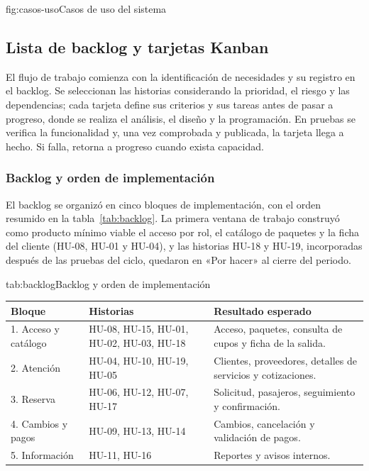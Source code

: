 \begin{landscape}
\thispagestyle{paisaje}
\begin{figuraapa}{fig:casos-uso}{Casos de uso del sistema}
\end{figuraapa}
\end{landscape}

\subsection{Lista de backlog y tarjetas Kanban}

El flujo de trabajo comienza con la identificación de necesidades y su
registro en el backlog. Se seleccionan las historias considerando la
prioridad, el riesgo y las dependencias; cada tarjeta define sus criterios y
sus tareas antes de pasar a progreso, donde se realiza el análisis, el
diseño y la programación. En pruebas se verifica la funcionalidad y, una vez
comprobada y publicada, la tarjeta llega a hecho. Si falla, retorna a
progreso cuando exista capacidad.

\subsubsection{Backlog y orden de implementación}

El backlog se organizó en cinco bloques de implementación, con el orden
resumido en la tabla~\ref{tab:backlog}. La primera ventana de trabajo
construyó como producto mínimo viable el acceso por rol, el catálogo de
paquetes y la ficha del cliente (HU-08, HU-01 y HU-04), y las historias
HU-18 y HU-19, incorporadas después de las pruebas del ciclo, quedaron en
«Por hacer» al cierre del periodo.

\begin{tablaapa}{tab:backlog}{Backlog y orden de implementación}
\small
\begin{tabular}{@{}p{3.4cm}p{5.6cm}p{5.6cm}@{}}
\toprule
Bloque & Historias & Resultado esperado \\
\midrule
1. Acceso y catálogo & HU-08, HU-15, HU-01, HU-02, HU-03, HU-18 & Acceso,
paquetes, consulta de cupos y ficha de la salida. \\
2. Atención & HU-04, HU-10, HU-19, HU-05 & Clientes, proveedores, detalles
de servicios y cotizaciones. \\
3. Reserva & HU-06, HU-12, HU-07, HU-17 & Solicitud, pasajeros, seguimiento
y confirmación. \\
4. Cambios y pagos & HU-09, HU-13, HU-14 & Cambios, cancelación y validación
de pagos. \\
5. Información & HU-11, HU-16 & Reportes y avisos internos. \\
\bottomrule
\end{tabular}
\end{tablaapa}

